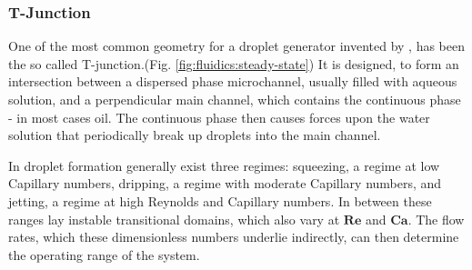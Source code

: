 \subsubsection{T-Junction}
One of the most common geometry for a droplet generator invented by \citet{lit:fluidics:t-junction:first}, has been the so called T-junction.(Fig. \ref{fig:fluidics:steady-state}) It is designed, to form an intersection between a dispersed phase microchannel, usually filled with aqueous solution, and a perpendicular main channel, which contains the continuous phase - in most cases oil. The continuous phase then causes forces upon the water solution that periodically break up droplets into the main channel.\cite{lit:fluidics:droplet:formation:t-junction:transition_exp} 

In droplet formation generally exist three regimes: squeezing, a regime at low Capillary numbers, dripping, a regime with moderate Capillary numbers, and jetting, a regime at high Reynolds and Capillary numbers. In between these ranges lay instable transitional domains, which also vary at $\mathbf{Re}$ and $\mathbf{Ca}$. The flow rates, which these dimensionless numbers underlie indirectly, can then determine the operating range of the system.

